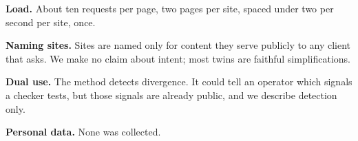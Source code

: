 \documentclass[10pt,a4paper]{article}
\begin{document}
\textbf{Load.} About ten requests per page, two pages per site, spaced under two per second per site, once.

\textbf{Naming sites.} Sites are named only for content they serve publicly to any client that asks. We make no claim about intent; most twins are faithful simplifications.

\textbf{Dual use.} The method detects divergence. It could tell an operator which signals a checker tests, but those signals are already public, and we describe detection only.

\textbf{Personal data.} None was collected.
\end{document}
